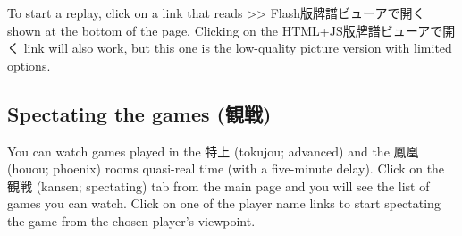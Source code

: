 \bigskip
To start a replay, click on a link that reads >> Flash版牌譜ビューアで開く shown at the bottom of the page. Clicking on the HTML+JS版牌譜ビューアで開く link will also work, but this one is the low-quality picture version with limited options. 

\subsection{Spectating the games (観戦)}
You can watch games played in the 特上 ({\jap tokujou}; advanced) and the 鳳凰 ({\jap houou}; phoenix) rooms quasi-real time (with a five-minute delay). Click on the 観戦 ({\jap kansen}; spectating) tab from the main page and you will see the list of games you can watch. Click on one of the player name links to start spectating the game from the chosen player's viewpoint. 

